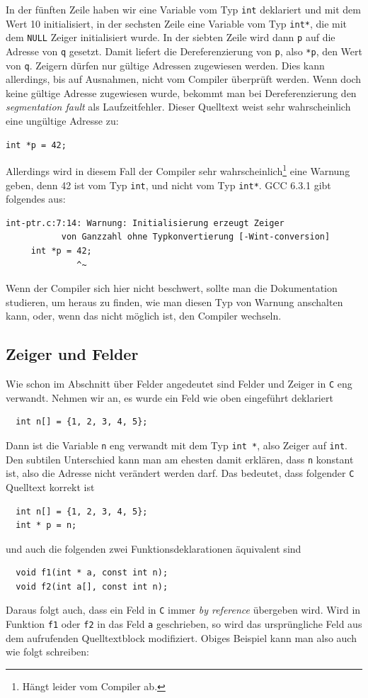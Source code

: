 In der fünften Zeile haben wir eine Variable vom Typ \verb|int| deklariert und mit dem Wert 10 initialisiert, in der sechsten Zeile eine Variable vom Typ \verb|int*|, die mit dem \verb|NULL| Zeiger initialisiert wurde.
In der siebten Zeile wird dann \verb|p| auf die Adresse von \verb|q| gesetzt.
Damit liefert die Dereferenzierung von \verb|p|, also \verb|*p|, den Wert von \verb|q|.
Zeigern dürfen nur gültige Adressen zugewiesen werden.
Dies kann allerdings, bis auf Ausnahmen, nicht vom Compiler überprüft werden.
Wenn doch keine gültige Adresse zugewiesen wurde, bekommt man bei Dereferenzierung den \emph{segmentation fault} als Laufzeitfehler.
Dieser Quelltext weist sehr wahrscheinlich eine ungültige Adresse zu:
\begin{lstlisting}
int *p = 42;
\end{lstlisting}
Allerdings wird in diesem Fall der Compiler sehr wahrscheinlich\footnote{Hängt leider vom Compiler ab.} eine Warnung geben, denn 42 ist vom Typ \verb|int|, und nicht vom Typ \verb|int*|.
GCC 6.3.1 gibt folgendes aus:
\begin{verbatim}
int-ptr.c:7:14: Warnung: Initialisierung erzeugt Zeiger 
           von Ganzzahl ohne Typkonvertierung [-Wint-conversion]
     int *p = 42;
              ^~
\end{verbatim}
Wenn der Compiler sich hier nicht beschwert, sollte man die Dokumentation studieren, um heraus zu finden, wie man diesen Typ von Warnung anschalten kann, oder, wenn das nicht möglich ist, den Compiler wechseln.

\subsection{Zeiger und Felder}

Wie schon im Abschnitt über Felder angedeutet sind Felder und Zeiger in \texttt{C} eng verwandt.
Nehmen wir an, es wurde ein Feld wie oben eingeführt deklariert
\begin{lstlisting}
  int n[] = {1, 2, 3, 4, 5};
\end{lstlisting}
Dann ist die Variable \verb|n| eng verwandt mit dem Typ \verb|int *|, also Zeiger auf \verb|int|.
Den subtilen Unterschied kann man am ehesten damit erklären, dass \verb|n| konstant ist, also die Adresse nicht verändert werden darf.
Das bedeutet, dass folgender \texttt{C} Quelltext korrekt ist
\begin{lstlisting}
  int n[] = {1, 2, 3, 4, 5};
  int * p = n;
\end{lstlisting}
und auch die folgenden zwei Funktionsdeklarationen äquivalent sind
\begin{lstlisting}
  void f1(int * a, const int n);
  void f2(int a[], const int n);
\end{lstlisting}
Daraus folgt auch, dass ein Feld in \texttt{C} immer \emph{by reference} übergeben wird.
Wird in Funktion \texttt{f1} oder \texttt{f2} in das Feld \texttt{a} geschrieben, so wird das ursprüngliche Feld aus dem aufrufenden Quelltextblock modifiziert.
Obiges Beispiel kann man also auch wie folgt schreiben:

